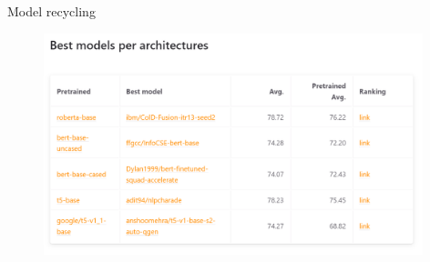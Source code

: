 
\begin{frame}{Model recycling}

\vfill

	\begin{figure}
		\centering
		\includegraphics[width = 11cm]{figure/model-recycling2.png}
	\end{figure}
	
\vfill

\end{frame}


\endlecture

